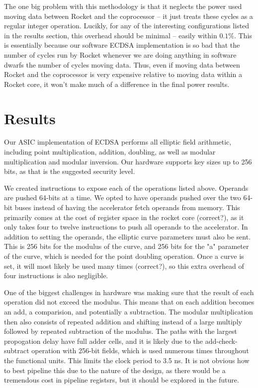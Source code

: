 \documentclass[twocolumn]{article}
\begin{document}
The one big problem with this methodology is that it neglects the
power used moving data between Rocket and the coprocessor -- it just
treats these cycles as a regular integer operation.  Lucikly, for any
of the interesting configurations listed in the results section, this
overhead should be minimal -- easily within $0.1\%$.  This is
essentially because our software ECDSA implementation is so bad that
the number of cycles run by Rocket whenever we are doing anything in
software dwarfs the number of cycles moving data.  Thus, even if
moving data between Rocket and the coprocessor is very expensive
relative to moving data within a Rocket core, it won't make much of a
difference in the final power results.

\section{Results}

Our ASIC implementation of ECDSA performs all elliptic field
arithmetic, including point multiplication, addition, doubling, as
well as modular multiplication and modular inversion. Our hardware
supports key sizes up to 256 bits, as that is the suggested security
level.

We created instructions to expose each of the operations listed
above. Operands are pushed 64-bits at a time. We opted to have
operands pushed over the two 64-bit buses instead of having the
accelerator fetch operands from memory. This primarily comes at the
cost of register space in the rocket core (correct?), as it only takes
four to twelve instructions to push all operands to the
accelerator. In addition to setting the operands, the elliptic curve
parameters must also be sent. This is 256 bits for the modulus of the
curve, and 256 bits for the "a" parameter of the curve, which is
needed for the point doubling operation. Once a curve is set, it will
most likely be used many times (correct?), so this extra overhead of
four instructions is also negligible.

One of the biggest challenges in hardware was making sure that the
result of each operation did not exceed the modulus. This means that
on each addition becomes an add, a comparision, and potentially a
subtraction. The modular multiplication then also consists of repeated
addition and shifting instead of a large multiply followed by repeated
subtraction of the modulus. The paths with the largest propogation
delay have full adder cells, and it is likely due to the
add-check-subtract operation with 256-bit fields, which is used
numerous times throughout the functional units. This limits the clock
period to 3.5 ns. It is not obvious how to best pipeline this due to
the nature of the design, as there would be a tremendous cost in
pipeline registsrs, but it should be explored in the future.
\end{document}
